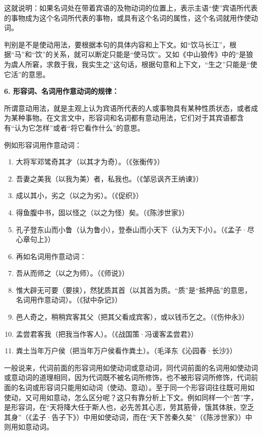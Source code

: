 这就说明：如果名词处在带着宾语的及物动词的位置上，表示主语“使”宾语所代表的事物成为这个名词所代表的事物，或具有这个名词的属性，这个名词就用作使动词。

判别是不是使动用法，要根据本句的具体内容和上下文。如“饮马长江”，根据“马”和“饮”的关系，就可以断定只能是“使马饮”。又如《中山狼传》中的“是狼为虞人所窘，求救于我，我实生之”这句话，根据句意和上下文，“生之”只能是“使它活”的意思。

\textbf{6. 形容词、名词用作意动词的规律：}

所谓意动用法，就是主观上认为宾语所代表的人或事物具有某种性质状态，或者成为某种事物。在文言文中，形容词和名词都有意动用法，它们对于其宾语都含有“认为它怎样”或者“将它看作什么”的意思。

例如形容词用作意动词：

\begin{enumerate}[label=\textcircled{\arabic*}]
	\item 大将军邓骘奇其才（以其才为奇）。（《张衡传》）
	\item 吾妻之美我（以我为美）者，私我也。（《邹忌讽齐王纳谏》）
	\item 成以其小，劣之（以之为劣）。（《促织》）
	\item 得鱼腹中书，固以怪之（以之为怪）矣。（《陈涉世家》）
	\item 孔子登东山而小鲁（认为鲁小），登泰山而小天下（认为天下小）。（《孟子·尽心章句上》）
	\item 再如名词用作意动词：
	\item 吾从而师之（以之为师）。（《师说》）
	\item 惟大辟无可要（要挟），然犹质其首（以其首为质。“质”是“抵押品”的意思，名词用作意动词）。（《狱中杂记》）
	\item 邑人奇之，稍稍宾客其父（把其父看成宾客），或以钱币乞之。（《伤仲永》）
	\item 孟尝君客我（把我当作客人）。（《战国策·冯谖客孟尝君》）
	\item 粪土当年万户侯（把当年万户侯看作粪土）。（毛泽东《沁园春·长沙》）
\end{enumerate}

一般说来，代词前面的形容词用如使动词或意动词，同代词前面的名词用如使动词或意动词的道理相同，因为代词既不被名词所修饰，也不被形容词所修饰，代词前面的名词或形容词只能用如动词（使动、意动）。至于同一个形容词往往既可用如使动，又可用如意动，怎么区分呢？这只有靠分析上下文。例如同样一个“苦”字，是形容词，在“天将降大任于斯人也，必先苦其心志，劳其筋骨，饿其体肤，空乏其身”（《孟子·告子下》）中用如使动词，而在“天下苦秦久矣”（《陈涉世家》）中则用如意动词。

